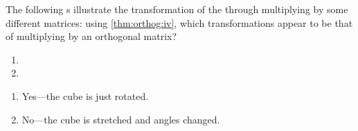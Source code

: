 \begin{example} 
The following s illustrate the transformation of the  through multiplying by some different matrices: using \cref{thm:orthog:iv}, which transformations appear to be that of multiplying by an orthogonal matrix?
\begin{enumerate}
\item {}

\item {}


\end{enumerate}

\begin{solution} 
\begin{enumerate}
\item Yes---the cube is just rotated.
\item No---the cube is stretched and angles changed.
\end{enumerate}
\end{solution}
\end{example}




